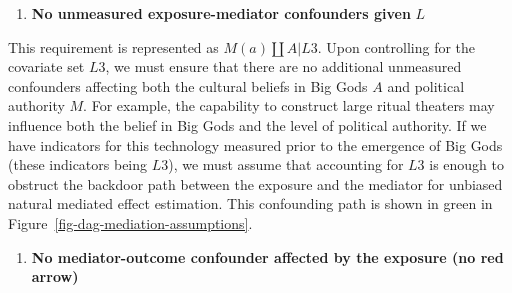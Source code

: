 \documentclass[
  singlecolumn]{report}
\providecommand{\tightlist}{%
  \setlength{\itemsep}{0pt}\setlength{\parskip}{0pt}}\usepackage{longtable,booktabs,array}
\begin{document}
\begin{enumerate}
\def\labelenumi{\arabic{enumi}.}
\setcounter{enumi}{2}
\tightlist
\item
  \textbf{No unmeasured exposure-mediator confounders given} \(L\)
\end{enumerate}

This requirement is represented as \(M(a) \coprod A | L3\). Upon
controlling for the covariate set \(L3\), we must ensure that there are
no additional unmeasured confounders affecting both the cultural beliefs
in Big Gods \(A\) and political authority \(M\). For example, the
capability to construct large ritual theaters may influence both the
belief in Big Gods and the level of political authority. If we have
indicators for this technology measured prior to the emergence of Big
Gods (these indicators being \(L3\)), we must assume that accounting for
\(L3\) is enough to obstruct the backdoor path between the exposure and
the mediator for unbiased natural mediated effect estimation. This
confounding path is shown in green in
Figure~\ref{fig-dag-mediation-assumptions}.

\begin{enumerate}
\def\labelenumi{\arabic{enumi}.}
\setcounter{enumi}{3}
\tightlist
\item
  \textbf{No mediator-outcome confounder affected by the exposure (no
  red arrow)}
\end{enumerate}
\end{document}

